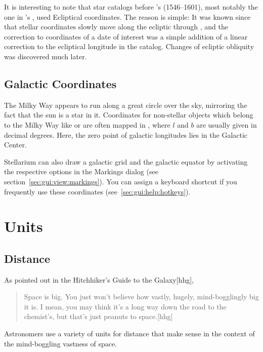 It is interesting to note that star catalogs before 's (1546--1601), most notably the one in 's
, used Ecliptical coordinates. The reason is
simple: It was known since  that stellar coordinates
slowly move along the ecliptic through , and the
correction to coordinates of a date of interest was a simple addition
of a linear correction to the ecliptical longitude in the
catalog. Changes of ecliptic obliquity was discovered much later.

\subsection{Galactic Coordinates}
\label{sec:Concepts:Galactic}

The Milky Way appears to run along a great circle over the sky,
mirroring the fact that the sun is a star in it. Coordinates for
non-stellar objects which belong to the Milky Way like
 or  are often mapped
in , where 
$l$ and  $b$ are usually given in decimal
degrees. Here, the zero point of galactic longitudes lies in the
Galactic Center.

Stellarium can also draw a galactic grid and the galactic equator by
activating the respective options in the Markings dialog (see
section~\ref{sec:gui:view:markings}). You can assign a keyboard
shortcut if you frequently use these coordinates
(see~\ref{sec:gui:help:hotkeys}).


\section{Units}
\label{sec:Concepts:Units}

\subsection{Distance}
\label{sec:Concepts:Distance}

As  pointed out in the Hitchhiker's Guide to the
Galaxy{[}hhg{]},

\begin{quote}
  Space is big. You just won't believe how vastly, hugely,
  mind-bogglingly big it is. I mean, you may think it's a long way
  down the road to the chemist's, but that's just peanuts to
  space.{[}hhg{]}
\end{quote}
Astronomers use a variety of units for distance that make sense in the
context of the mind-boggling vastness of space.


